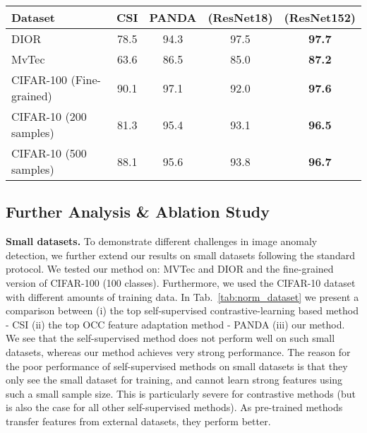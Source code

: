 \documentclass[letterpaper]{article} \usepackage{aaai23}  \usepackage{times}  \usepackage{helvet}  \usepackage{courier}  \usepackage[hyphens]{url}  \usepackage{graphicx} \usepackage{amsmath, amssymb}
\begin{document}
\begin{table*}[t]
  \centering
  \begin{tabular}{lcccc}
    \toprule
Dataset & CSI  & PANDA &  (ResNet18) &  (ResNet152) \\
\midrule
DIOR &  78.5 & 94.3 & 97.5 & \textbf{97.7}  \\
MvTec & 63.6 & 86.5 & 85.0 & \textbf{87.2} \\
CIFAR-100 (Fine-grained)    &	90.1	&	97.1	&	92.0	& \textbf{97.6}	\\		
CIFAR-10 (200 samples)    &	81.3	&	95.4	&	93.1	& \textbf{96.5}	\\
CIFAR-10 (500 samples) &	88.1	&	95.6	&	93.8	& \textbf{96.7} \\
    \bottomrule
  \end{tabular}
    \caption{Anomaly detection accuracy (mean ROC-AUC\%) on small dataset. Best in bold.}
    \label{tab:norm_dataset}
\end{table*}

\subsection{Further Analysis \& Ablation Study}
\label{exp:analysis}

\textbf{Small datasets.} To demonstrate different challenges in image anomaly detection, we further extend our results on small datasets following the standard protocol. We tested our method on: MVTec \cite{bergmann2019mvtec} and DIOR \cite{li2020object} and the fine-grained version of CIFAR-100 (100 classes). Furthermore, we used the CIFAR-10 dataset with different amounts of training data. In Tab.~\ref{tab:norm_dataset} we present a comparison between (i) the top self-supervised contrastive-learning based method - CSI (ii) the top OCC feature adaptation method - PANDA (iii) our method. We see that the self-supervised method does not perform well on such small datasets, whereas our method achieves very strong performance. The reason for the poor performance of self-supervised methods on small datasets is that they only see the small dataset for training, and cannot learn strong features using such a small sample size. This is particularly severe for contrastive methods (but is also the case for all other self-supervised methods). As pre-trained methods transfer features from external datasets, they perform better. 
\end{document}
